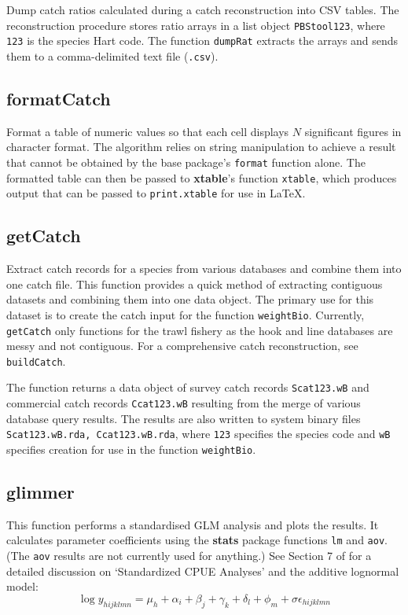 \documentclass[letterpaper,12pt,fleqn]{article}
\def\tab{\hspace{0.5 in}}
\newcommand{\code}[1]{\small\texttt{#1}\normalsize}
\newcommand{\pkg}[1]{{\bf #1}}
\newcommand{\sQuote}[1]{`#1'}
\newcommand{\eqn}[1]{\begin{equation}#1\end{equation}}
\begin{document}
\tab Dump catch ratios calculated during a catch reconstruction into CSV tables.
The reconstruction procedure stores ratio arrays in a list object \code{PBStool123}, where \code{123} is the species Hart code.
The function \code{dumpRat} extracts the arrays and sends them to a comma-delimited text file (\code{.csv}).

\subsection {formatCatch}

\tab Format a table of numeric values so that each cell displays $N$ significant figures in character format. The algorithm relies on string manipulation to achieve a result that cannot be obtained by the base package's \code{format} function alone. The formatted table can then be passed to \pkg{xtable}'s function \code{xtable}, which produces output that can be passed to \code{print.xtable} for use in LaTeX.

\subsection {getCatch}

\tab Extract catch records for a species from various databases and combine them into one catch file.
This function provides a quick method of extracting contiguous datasets and combining them into one data object. 
The primary use for this dataset is to create the catch input for the function \code{weightBio}.
Currently, \code{getCatch} only functions for the trawl fishery as the hook and line databases are messy and not contiguous. 
For a comprehensive catch reconstruction, see \code{buildCatch}.

\tab The function returns a data object of survey catch records \code{Scat123.wB} and commercial catch records \code{Ccat123.wB} resulting from the merge of various database query results. The results are also written to system binary files \code{Scat123.wB.rda, Ccat123.wB.rda}, where \code{123} specifies the species code and \code{wB} specifies creation for use in the function \code{weightBio}.

\subsection {glimmer}

\tab This function performs a standardised GLM analysis and plots the results. It calculates parameter coefficients using the \pkg{stats} package functions \code{lm} and \code{aov}. (The \code{aov} results are not currently used for anything.) See Section 7 of \citet{Schnute-etal:2004a} for a detailed discussion on \sQuote{Standardized CPUE Analyses} and the additive lognormal model:
%
\eqn{\log y_{hijklmn} = \mu_h + \alpha_i + \beta_j + \gamma_k + \delta_l + \phi_m + \sigma\epsilon_{hijklmn}}
\end{document}
